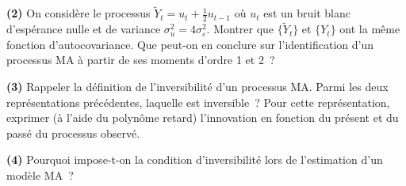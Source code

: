 \documentclass[10pt,a4paper,notitlepage,twocolumn]{article}
\newcommand{\question}[1]{\textbf{(#1)}}
\begin{document}
\question{2} On considère le processus $\tilde Y_t = u_t +
\frac{1}{2}u_{t-1}$ où $u_t$ est un bruit blanc d'espérance nulle et
de variance $\sigma_u^2 = 4\sigma_{\varepsilon}^2$. Montrer que
$\{\tilde Y_t\}$ et $\{Y_t\}$ ont la même fonction d'autocovariance.
Que peut-on en conclure sur l'identification d'un processus MA à partir
de ses moments d'ordre 1 et 2~?\newline

\question{3} Rappeler la définition de l'inversibilité d'un processus
MA. Parmi les deux représentations précédentes, laquelle est
inversible~? Pour cette représentation, exprimer (à l'aide du polynôme
retard) l'innovation en fonction du présent et du passé du processus
observé.\newline

\question{4} Pourquoi impose-t-on la condition d'inversibilité lors de
l'estimation d'un modèle MA~?
\end{document}
